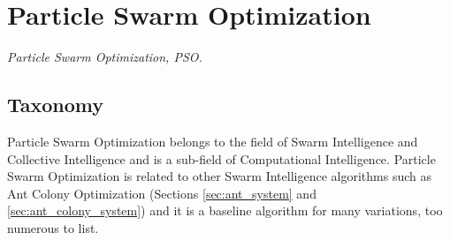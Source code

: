 

\section{Particle Swarm Optimization} 
\label{sec:pso}

\emph{Particle Swarm Optimization, PSO.}

\subsection{Taxonomy}
Particle Swarm Optimization belongs to the field of Swarm Intelligence and Collective Intelligence and is a sub-field of Computational Intelligence.
Particle Swarm Optimization is related to other Swarm Intelligence algorithms such as Ant Colony Optimization (Sections \ref{sec:ant_system} and \ref{sec:ant_colony_system}) and it is a baseline algorithm for many variations, too numerous to list.


